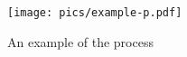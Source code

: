 \begin{figure}
    \centering
    \texttt{[image: pics/example-p.pdf]}
    \vspace{-7pt}
    \caption{An example of the process}
    \label{fig:example_pipeline}
    \vspace{-10pt}
\end{figure}